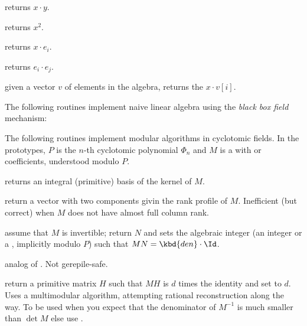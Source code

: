  returns $x\cdot y$.

 returns $x^2$.

 returns $x\cdot e_i$.

 returns $e_i\cdot e_j$.

 given a vector $v$ of elements
in the algebra, returns the $x\cdot v[i]$.

The following routines implement naive linear algebra using the \emph{black box
field} mechanism:







The following routines implement modular algorithms in cyclotomic fields. In
the prototypes, $P$ is the $n$-th cyclotomic polynomial $\Phi_n$ and $M$ is a
 with  or  coefficients, understood modulo $P$.

 returns an integral (primitive)
basis of the kernel of $M$.

 return a vector with two
  components givin the rank profile of $M$. Inefficient
(but correct) when $M$ does not have almost full column rank.

assume that $M$ is invertible; return $N$ and sets the algebraic integer
 (an integer or a , implicitly modulo $P$)
such that $M N = \kbd{den} \cdot \Id$.

 analog
of . Not gerepile-safe.

return a primitive matrix $H$ such that $M H$ is $d$ times the identity
and set  to $d$. Uses a multimodular algorithm, attempting
rational reconstruction along the way. To be used when you expect that the
denominator of $M^{-1}$ is much smaller than $\det M$ else use .

